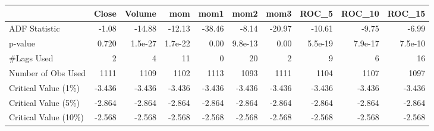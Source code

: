 {\scriptsize
\begin{tabular}{lrrrrrrrrr}
\toprule
{} &        Close &        Volume &           mom &         mom1 &          mom2 &         mom3 &         ROC\_5 &        ROC\_10 &        ROC\_15 \\
\midrule
ADF Statistic               &    -1.08 & -14.88 & -12.13 &   -38.46 & -8.14 &   -20.97 & -10.61 & -9.75 & -6.99 \\
p-value                     &     0.720 &  1.5e-27 &  1.7e-22 &     0.00 &  9.8e-13 &     0.00 &  5.5e-19 &  7.9e-17 &  7.5e-10 \\
\#Lags Used                  &     2 &  4 &  11 &     0 &  20 &     2 &  9 &  6 &  16 \\
Number of Obs Used &  1111 &  1109 &  1102 &  1113 &  1093 &  1111 &  1104 &  1107 &  1097 \\
Critical Value (1\%)         &    -3.436 & -3.436 & -3.436 &    -3.436 & -3.436 &    -3.436 & -3.436 & -3.436 & -3.436 \\
Critical Value (5\%)         &    -2.864 & -2.864 & -2.864 &    -2.864 & -2.864 &    -2.864 & -2.864 & -2.864 & -2.864 \\
Critical Value (10\%)        &    -2.568 & -2.568 & -2.568 &    -2.568 & -2.568 &    -2.568 & -2.568 & -2.568 & -2.568 \\
\bottomrule
\end{tabular}
}
